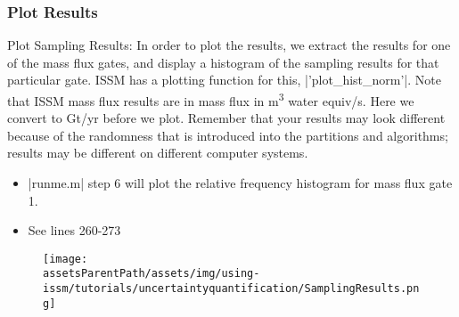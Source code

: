\subsubsection{Plot Results} %
Plot Sampling Results: In order to plot the results, we extract the results for one of the mass flux gates, and display a histogram of the sampling results for that particular gate. ISSM has a plotting function for this, \lstinlinebg|'plot_hist_norm'|. Note that ISSM mass flux results are in mass flux in m\textsuperscript{3} water equiv/s. Here we convert to Gt/yr before we plot. Remember that your results may look different because of the randomness that is introduced into the partitions and algorithms; results may be different on different computer systems.
\begin{itemize}
	\item \lstinlinebg|runme.m| step 6 will plot the relative frequency histogram for mass flux gate 1.
	\item See lines 260-273
\end{itemize}
\begin{figure}[H]
	\begin{center}
		\texttt{[image: \\assetsParentPath/assets/img/using-issm/tutorials/uncertaintyquantification/SamplingResults.png]}
	\end{center}
\end{figure}

